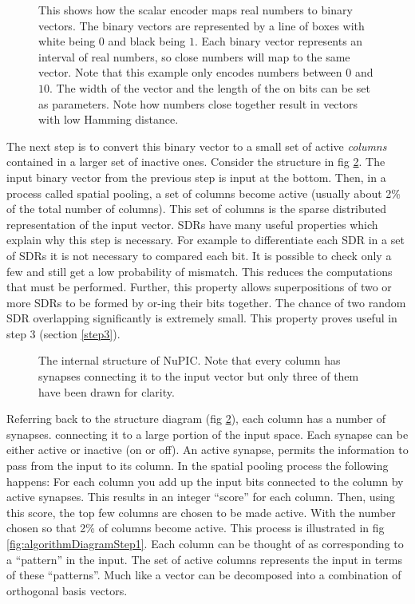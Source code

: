 \documentclass[a4paper]{jpconf}
\begin{document}
			\begin{figure}
				\centering
				
				\caption{This shows how the scalar encoder maps real numbers to binary vectors. The binary vectors are represented by a line of boxes with white being $0$ and black being $1$. Each binary vector represents an interval of real numbers, so close numbers will map to the same vector. Note that this example only encodes numbers between $0$ and $10$. The width of the vector and the length of the on bits can be set as parameters. Note how numbers close together result in vectors with low Hamming distance.}
				\label{fig:scalarEncoder}
			\end{figure}
			The next step is to convert this binary vector to a small set of active \emph{columns} contained in a larger set of inactive ones. Consider the structure in fig \ref{fig:structureDiagram}. The input binary vector from the previous step is input at the bottom. Then, in a process called spatial pooling, a set of columns become active (usually about 2\% of the total number of columns). This set of columns is the sparse distributed representation of the input vector. SDRs have many useful properties which explain why this step is necessary. For example to differentiate each SDR in a set of SDRs it is not necessary to compared each bit. It is possible to check only a few and still get a low probability of mismatch. This reduces the computations that must be performed. Further, this property allows superpositions of two or more SDRs to be formed by or-ing their bits together. The chance of two random SDR overlapping significantly is extremely small. This property proves useful in step 3 (section \ref{step3}).
			
			\begin{figure}[h]
				\centering
				
				\caption{The internal structure of NuPIC. Note that every column has synapses connecting it to the input vector but only three of them have been drawn for clarity.}
				\label{fig:structureDiagram}
			\end{figure}
			Referring back to the structure diagram (fig \ref{fig:structureDiagram}), each column has a number of synapses. connecting it to a large portion of the input space. Each synapse can be either active or inactive (on or off). An active synapse, permits the information to pass from the input to its column. In the spatial pooling process the following happens: For each column you add up the input bits connected to the column by active synapses. This results in an integer ``score'' for each column. Then, using this score, the top few columns are chosen to be made active. With the number chosen so that 2\% of columns become active. This process is illustrated in fig \ref{fig:algorithmDiagramStep1}. Each column can be thought of as corresponding to a ``pattern'' in the input. The set of active columns represents the input in terms of these ``patterns''. Much like a vector can be decomposed into a combination of orthogonal basis vectors.
			
\end{document}
